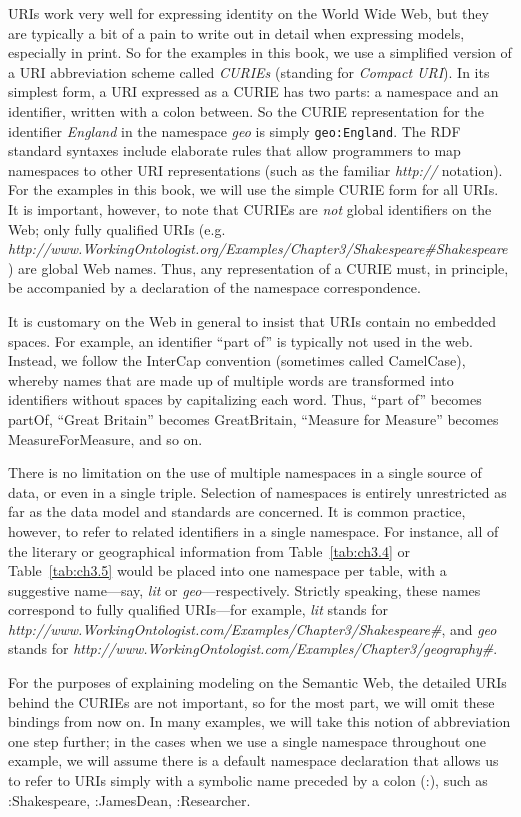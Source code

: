 URIs work very well for expressing identity on the World Wide Web, but
they are typically a bit of a pain to write out in detail when
expressing models, especially in print. So for the examples in this
book, we use a simplified version of a URI abbreviation scheme called
\emph{CURIEs} (standing for \emph{Compact URI}). In its simplest form, a
URI expressed as a CURIE has two parts: a namespace and an identifier,
written with a colon between. So the CURIE representation for the
identifier \emph{England} in the namespace \emph{geo} is simply \texttt{geo:England}.
The RDF standard syntaxes include elaborate rules that allow programmers
to map namespaces to other URI representations (such as the familiar
\emph{http://} notation). For the examples in this book, we will use the
simple CURIE form for all URIs. It is important, however, to note that
CURIEs are \emph{not} global identifiers on the Web; only fully
qualified URIs (e.g.
\emph{http://www.WorkingOntologist.org/Examples/Chapter3/Shakespeare\#Shakespeare})
are global Web names. Thus, any representation of a CURIE must, in
principle, be accompanied by a declaration of the namespace
correspondence.

It is customary on the Web in general
to insist that URIs contain no embedded spaces. For example, an
identifier ``part of'' is typically not used in the web. Instead, we
follow the InterCap convention (sometimes called CamelCase), whereby
names that are made up of multiple words are transformed into
identifiers without spaces by capitalizing each word. Thus, ``part of''
becomes partOf, ``Great Britain'' becomes GreatBritain, ``Measure for
Measure'' becomes MeasureForMeasure, and so on.

There is no limitation on the use of multiple namespaces in a single
source of data, or even in
a single triple. Selection of namespaces is entirely unrestricted as far
as the data model and standards are concerned. It is common practice,
however, to refer to related identifiers in a single namespace. For
instance, all of the literary or geographical information from Table~\ref{tab:ch3.4}
or Table~\ref{tab:ch3.5} would be placed into one namespace per table, with a
suggestive name---say, \emph{lit} or \emph{geo}---respectively. Strictly
speaking, these names correspond to fully qualified URIs---for example,
\emph{lit} stands for \emph{http://www.WorkingOntologist.com/Examples/Chapter3/Shakespeare\#}, and
\emph{geo} stands for \emph{http://www.WorkingOntologist.com/Examples/Chapter3/geography\#}.


For the purposes of explaining modeling on the Semantic Web, the
detailed URIs behind the CURIEs are not important, so for the most part,
we will omit these bindings from now on. In many examples, we will take
this notion of abbreviation one step further; in the cases when we use a
single namespace throughout one example, we will assume there is a
default namespace declaration that allows us to refer to URIs simply
with a symbolic name preceded by a colon (:), such as :Shakespeare,
:JamesDean, :Researcher.

